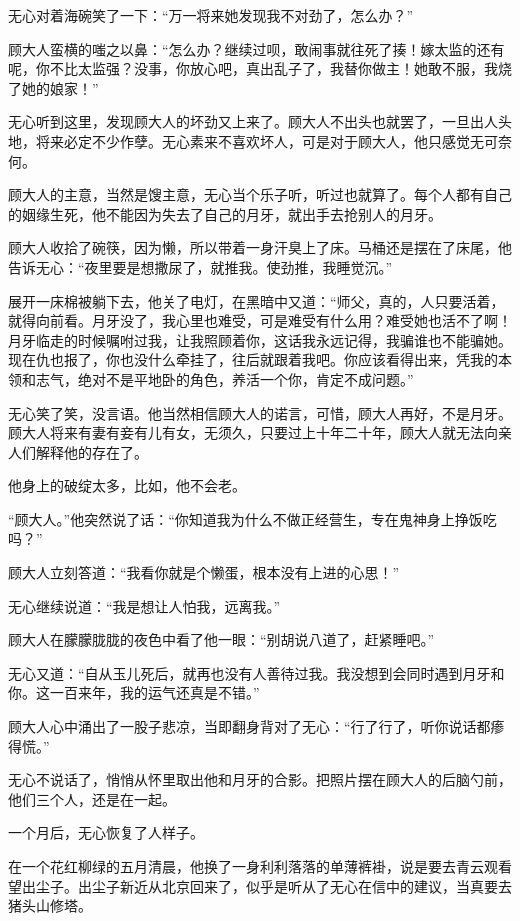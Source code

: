 无心对着海碗笑了一下：``万一将来她发现我不对劲了，怎么办？''

顾大人蛮横的嗤之以鼻：``怎么办？继续过呗，敢闹事就往死了揍！嫁太监的还有呢，你不比太监强？没事，你放心吧，真出乱子了，我替你做主！她敢不服，我烧了她的娘家！''

无心听到这里，发现顾大人的坏劲又上来了。顾大人不出头也就罢了，一旦出人头地，将来必定不少作孽。无心素来不喜欢坏人，可是对于顾大人，他只感觉无可奈何。

顾大人的主意，当然是馊主意，无心当个乐子听，听过也就算了。每个人都有自己的姻缘生死，他不能因为失去了自己的月牙，就出手去抢别人的月牙。

顾大人收拾了碗筷，因为懒，所以带着一身汗臭上了床。马桶还是摆在了床尾，他告诉无心：``夜里要是想撒尿了，就推我。使劲推，我睡觉沉。''

展开一床棉被躺下去，他关了电灯，在黑暗中又道：``师父，真的，人只要活着，就得向前看。月牙没了，我心里也难受，可是难受有什么用？难受她也活不了啊！月牙临走的时候嘱咐过我，让我照顾着你，这话我永远记得，我骗谁也不能骗她。现在仇也报了，你也没什么牵挂了，往后就跟着我吧。你应该看得出来，凭我的本领和志气，绝对不是平地卧的角色，养活一个你，肯定不成问题。''

无心笑了笑，没言语。他当然相信顾大人的诺言，可惜，顾大人再好，不是月牙。顾大人将来有妻有妾有儿有女，无须久，只要过上十年二十年，顾大人就无法向亲人们解释他的存在了。

他身上的破绽太多，比如，他不会老。

``顾大人。''他突然说了话：``你知道我为什么不做正经营生，专在鬼神身上挣饭吃吗？''

顾大人立刻答道：``我看你就是个懒蛋，根本没有上进的心思！''

无心继续说道：``我是想让人怕我，远离我。''

顾大人在朦朦胧胧的夜色中看了他一眼：``别胡说八道了，赶紧睡吧。''

无心又道：``自从玉儿死后，就再也没有人善待过我。我没想到会同时遇到月牙和你。这一百来年，我的运气还真是不错。''

顾大人心中涌出了一股子悲凉，当即翻身背对了无心：``行了行了，听你说话都瘆得慌。''

无心不说话了，悄悄从怀里取出他和月牙的合影。把照片摆在顾大人的后脑勺前，他们三个人，还是在一起。

一个月后，无心恢复了人样子。

在一个花红柳绿的五月清晨，他换了一身利利落落的单薄裤褂，说是要去青云观看望出尘子。出尘子新近从北京回来了，似乎是听从了无心在信中的建议，当真要去猪头山修塔。

